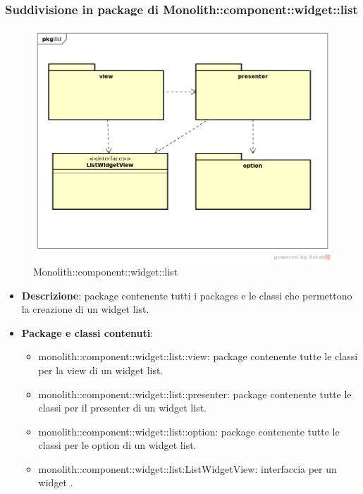 \subsubsection{Suddivisione in package  di Monolith::component::widget::list}
\label{Monolith::component::widget::list}
\begin{figure}[H]
	\centering
	\includegraphics[scale=0.5]{Sezioni/imgPackage/component_widget_list.png}
	\caption{Monolith::component::widget::list}
\end{figure}
\begin{itemize}
	\item{\textbf{Descrizione}}: package contenente tutti i packages e le classi che permettono la creazione di un widget list.
	\item{\textbf{Package e classi contenuti}}:
	\begin{itemize}
	\item{monolith::component::widget::list::view}: package contenente tutte le classi per la view di un widget list.
	\item{monolith::component::widget::list::presenter}: package contenente tutte le classi per il presenter di un widget list.
	\item{monolith::component::widget::list::option}: package contenente tutte le classi per le option di un widget list.
	\item{monolith::component::widget::list:ListWidgetView}: interfaccia per un widget .
	\end{itemize}

\end{itemize}


